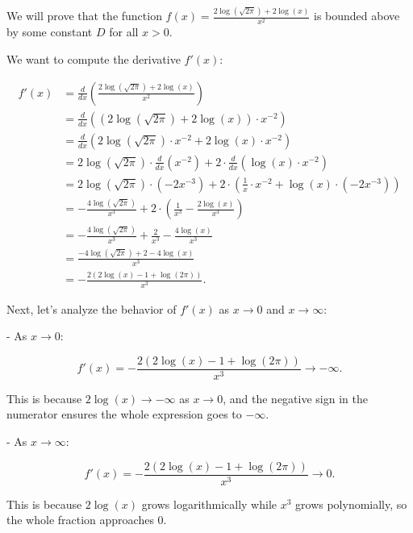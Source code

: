 \documentclass[a4 paper]{article}
\theoremstyle{boldStyle}
\theoremstyle{boldBlueStyle}
\theoremstyle{boldPurpleStyle}
\theoremstyle{boldRedStyle}
\begin{document}
We will prove that the function $f(x) = \frac{2\log(\sqrt{2\pi}) + 2\log(x)}{x^2}$ is bounded above by some constant $D$ for all $x > 0$. 

We want to compute the derivative \(f'(x)\):

\begin{align*}
f'(x) &= \frac{d}{dx} \left(\frac{2\log(\sqrt{2\pi}) + 2\log(x)}{x^2}\right) \\
&= \frac{d}{dx} \left( \left(2\log(\sqrt{2\pi}) + 2\log(x)\right) \cdot x^{-2} \right) \\
&= \frac{d}{dx} \left( 2\log(\sqrt{2\pi}) \cdot x^{-2} + 2\log(x) \cdot x^{-2} \right) \\
&= 2\log(\sqrt{2\pi}) \cdot \frac{d}{dx}(x^{-2}) + 2 \cdot \frac{d}{dx}(\log(x) \cdot x^{-2}) \\
&= 2\log(\sqrt{2\pi}) \cdot (-2x^{-3}) + 2 \cdot \left( \frac{1}{x} \cdot x^{-2} + \log(x) \cdot (-2x^{-3}) \right) \\
&= -\frac{4\log(\sqrt{2\pi})}{x^3} + 2 \cdot \left( \frac{1}{x^3} - \frac{2\log(x)}{x^3} \right) \\
&= -\frac{4\log(\sqrt{2\pi})}{x^3} + \frac{2}{x^3} - \frac{4\log(x)}{x^3} \\
&= \frac{-4\log(\sqrt{2\pi}) + 2 - 4\log(x)}{x^3} \\
&= -\frac{2(2\log(x) - 1 + \log(2\pi))}{x^3}.
\end{align*}

Next, let's analyze the behavior of \(f'(x)\) as \(x \to 0\) and \(x \to \infty\):

- As \(x \to 0\):

\[
f'(x) = -\frac{2(2\log(x) - 1 + \log(2\pi))}{x^3} \to -\infty.
\]

This is because \(2\log(x) \to -\infty\) as \(x \to 0\), and the negative sign in the numerator ensures the whole expression goes to \(-\infty\).

- As \(x \to \infty\):

\[
f'(x) = -\frac{2(2\log(x) - 1 + \log(2\pi))}{x^3} \to 0.
\]

This is because \(2\log(x)\) grows logarithmically while \(x^3\) grows polynomially, so the whole fraction approaches \(0\).
\end{document}

